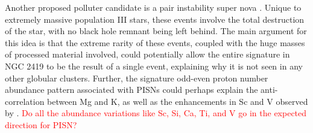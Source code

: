 \documentclass[a4paper,fleqn,usenatbib]{mnras}
\newcommand{\todo}[1]{\textcolor{red}{#1}}
\begin{document}
Another proposed  polluter candidate is a pair instability super nova \citep[PISN;][]{carretta2013}. Unique to extremely massive population III stars, these events involve the total destruction of the star, with no black hole remnant being left behind. The main argument for this idea is that the extreme rarity of these events, coupled with the huge masses of processed material involved, could potentially allow the entire signature in NGC 2419 to be the result of a single event, explaining why it is not seen in any other globular clusters. Further, the signature odd-even proton number abundance pattern associated with PISNs could perhaps explain the anti-correlation between Mg and K, as well as the enhancements in Sc and V observed by \cite{cohenkirby2012}. \todo{Do all the abundance variations like Sc, Si, Ca, Ti, and V go in the expected direction for PISN?}



\end{document}
